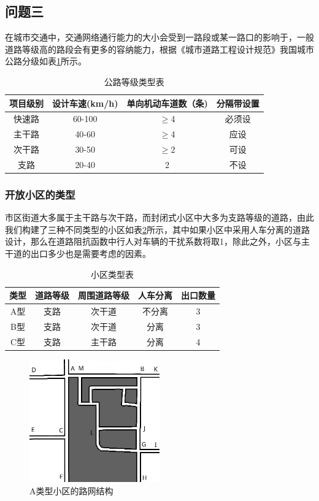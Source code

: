 \documentclass[fontset=windows,a4paper,12pt]{ctexart}
\begin{document}
	\subsection{问题三}
		
		在城市交通中，交通网络通行能力的大小会受到一路段或某一路口的影响于，一般道路等级高的路段会有更多的容纳能力，根据《城市道路工程设计规范》我国城市公路分级如表\ref{tab:road_type}所示。
		\begin{table}[!htbp]
			\centering
			\caption{公路等级类型表}
			\label{tab:road_type}
			\begin{tabular}{c|ccc}
				\toprule[1pt]
				项目级别&设计车速(km/h)&单向机动车道数（条)&分隔带设置\\
				\hline
				快速路	&60-100	&$\geq$4	&必须设\\
				主干路	&40-60	&$\geq$4	&应设\\
				次干路	&30-50	&$\geq$2	&可设\\
				支路	 &20-40	 &2			&不设\\
				\bottomrule[1pt]
			\end{tabular}
		\end{table}
		\subsubsection{开放小区的类型}
		市区街道大多属于主干路与次干路，而封闭式小区中大多为支路等级的道路，由此我们构建了三种不同类型的小区如表\ref{tab:apartment_type}所示，其中如果小区中采用人车分离的道路设计，那么在道路阻抗函数中行人对车辆的干扰系数将取1，除此之外，小区与主干道的出口多少也是需要考虑的因素。
		\begin{table}[!htbp]
			\centering
			\caption{小区类型表}
			\label{tab:apartment_type}
			\begin{tabular}{c|cccc}
				\toprule[1pt] 
				类型 & 道路等级 & 周围道路等级 & 人车分离 & 出口数量 \\ 
				\hline 
				A型 & 支路 & 次干道 & 不分离 &  3\\ 
				B型 & 支路 & 次干道 &  分离&  3\\ 
				C型 & 支路 & 主干路 &  分离&  4\\ 
				\bottomrule[1pt]
				\end{tabular} 
		\end{table}
		\begin{figure}[!htbp]
			\centering
			\includegraphics[width=0.5\textwidth]{pic/net_a.jpg}
			\caption{A类型小区的路网结构}
			\label{fig:net_a}
		\end{figure}		
		
\end{document}
